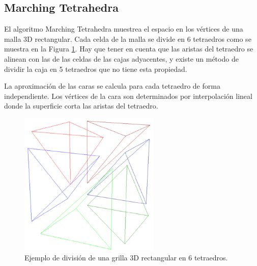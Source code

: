 \documentclass[12pt]{article}
\begin{document}
\subsection{Marching Tetrahedra}
\noindent El algoritmo Marching Tetrahedra\cite{marching}\cite{marchingt} muestrea el espacio en los vértices de una malla 3D rectangular. Cada celda de la malla se divide en 6 tetraedros como se muestra en la Figura \ref{6tet}. Hay que tener en cuenta que las aristas del tetraedro se alinean con las de las celdas de las cajas adyacentes, y existe un método de dividir la caja en 5 tetraedros que no tiene esta propiedad.

La aproximación de las caras se calcula para cada tetraedro de forma independiente. Los vértices de la cara son determinados por interpolación lineal donde la superficie corta las aristas del tetraedro.
\begin{figure}[h!]
\includegraphics[width=0.6\textwidth,center]{mt1.png}
\caption{Ejemplo de división de una grilla 3D rectangular en 6 tetraedros.}
\label{6tet}
\end{figure}
\end{document}
